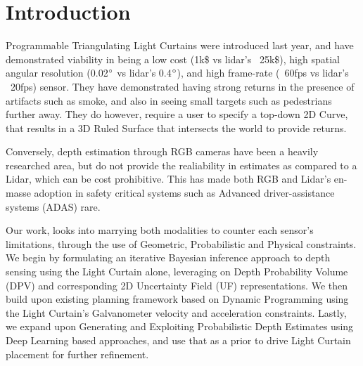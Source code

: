 \documentclass[review]{cvpr}
\begin{document}
\fi


\section{Introduction}

Programmable Triangulating Light Curtains \cite{bartels2019Agile} were introduced last year, and have demonstrated viability in being a low cost (1k\$ vs lidar's ~25k\$), high spatial angular resolution (0.02$\degree$ vs lidar's  0.4$\degree$), and high frame-rate (~60fps vs lidar's ~20fps) sensor. They have demonstrated having strong returns in the presence of artifacts such as smoke, and also in seeing small targets such as pedestrians further away. They do however, require a user to specify a top-down 2D Curve, that results in a 3D Ruled Surface that intersects the world to provide returns. 

Conversely, depth estimation through RGB cameras have been a heavily researched area, but do not provide the realiability in estimates as compared to a Lidar, which can be cost prohibitive. This has made both RGB and Lidar's en-masse adoption in safety critical systems such as Advanced driver-assistance systems (ADAS) rare. 

Our work, looks into marrying both modalities to counter each sensor's limitations, through the use of Geometric, Probabilistic and Physical constraints. We begin by formulating an iterative Bayesian inference approach to depth sensing using the Light Curtain alone, leveraging on Depth Probability Volume (DPV) and corresponding 2D Uncertainty Field (UF) representations. We then build upon existing planning framework based on Dynamic Programming using the Light Curtain's Galvanometer velocity and acceleration constraints. Lastly, we expand upon Generating and Exploiting Probabilistic Depth Estimates using Deep Learning based approaches, and use that as a prior to drive Light Curtain placement for further refinement.





  

{\small


}
\end{document}
